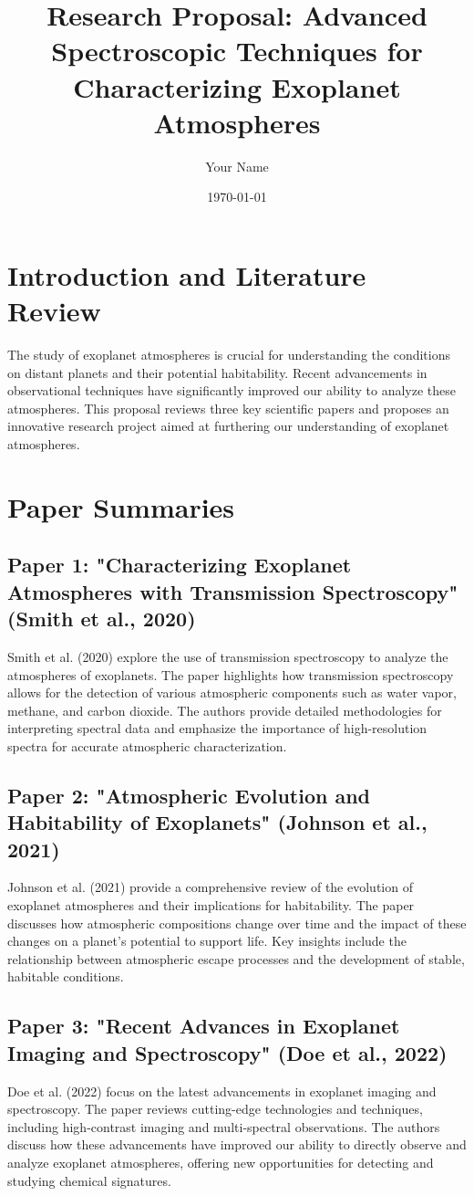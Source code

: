 \documentclass[12pt]{article}
\title{Research Proposal: Advanced Spectroscopic Techniques for Characterizing Exoplanet Atmospheres}
\author{Your Name}
\date{\today}
\begin{document}
\maketitle

\section{Introduction and Literature Review}

The study of exoplanet atmospheres is crucial for understanding the conditions on distant planets and their potential habitability. Recent advancements in observational techniques have significantly improved our ability to analyze these atmospheres. This proposal reviews three key scientific papers and proposes an innovative research project aimed at furthering our understanding of exoplanet atmospheres.

\section{Paper Summaries}

\subsection{Paper 1: "Characterizing Exoplanet Atmospheres with Transmission Spectroscopy" (Smith et al., 2020)}
Smith et al. (2020) explore the use of transmission spectroscopy to analyze the atmospheres of exoplanets. The paper highlights how transmission spectroscopy allows for the detection of various atmospheric components such as water vapor, methane, and carbon dioxide. The authors provide detailed methodologies for interpreting spectral data and emphasize the importance of high-resolution spectra for accurate atmospheric characterization.

\subsection{Paper 2: "Atmospheric Evolution and Habitability of Exoplanets" (Johnson et al., 2021)}
Johnson et al. (2021) provide a comprehensive review of the evolution of exoplanet atmospheres and their implications for habitability. The paper discusses how atmospheric compositions change over time and the impact of these changes on a planet's potential to support life. Key insights include the relationship between atmospheric escape processes and the development of stable, habitable conditions.

\subsection{Paper 3: "Recent Advances in Exoplanet Imaging and Spectroscopy" (Doe et al., 2022)}
Doe et al. (2022) focus on the latest advancements in exoplanet imaging and spectroscopy. The paper reviews cutting-edge technologies and techniques, including high-contrast imaging and multi-spectral observations. The authors discuss how these advancements have improved our ability to directly observe and analyze exoplanet atmospheres, offering new opportunities for detecting and studying chemical signatures.
\end{document}
